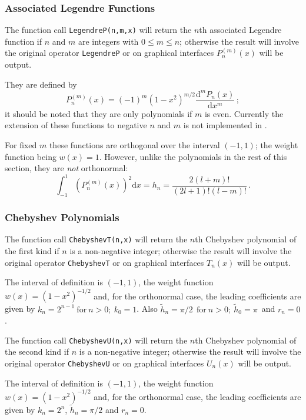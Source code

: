 \subsubsection{Associated Legendre Functions}
The function call \texttt{LegendreP(n,m,x)} will return the $n$th associated
Legendre function if $n$ and $m$ are integers with $0 \leq m \leq n$;
otherwise the result will involve the original operator \texttt{LegendreP} or
on graphical interfaces $P_n^{(m)}(x)$ will be output.

They are defined by
\[P_n^{(m)}(x) = (-1)^m(1-x^2)^{m/2}\frac{\mathrm{d}^m P_n(x)}{\mathrm{d}x^m}\,;\]
it should be noted that they are only polynomials if $m$ is even. Currently
the extension of these functions to negative $n$ and $m$ is not implemented
in \REDUCE.

For fixed $m$ these functions are orthogonal over the interval $(-1, 1)$;
the weight function being $w(x)=1$. However, unlike the polynomials in the rest
of this section, they are \emph{not} orthonormal:
\[\int_{-1}^1 \left(P_n^{(m)}(x)\right)^2 \mathrm{d}x = h_n =
\frac{2(l+m)!}{(2l+1)!(l-m)!}\,.\]

\subsubsection{Chebyshev Polynomials}
\hypertarget{CHEBYSHEVP}{}
 
The function call \texttt{ChebyshevT(n,x)} will return the $n$th Chebyshev
polynomial of the first kind if $n$ is a non-negative integer; otherwise the
result will involve the original operator \texttt{ChebyshevT} or on graphical
interfaces $T_n(x)$ will be output.

The interval of definition is $(-1, 1)$, the weight function
$w(x)=(1-x^2)^{-1/2}$ and, for the orthonormal case, the leading
coefficients are given by $k_n= 2^{n-1}\ \mbox{for}\ n>0;\ k_0 =1$. Also
$\tilde{h}_n = \pi/2\ \ \mbox{for}\ n>0;\ \tilde{h}_0 =\pi\,$ and $r_n=0$.

The function call \texttt{ChebyshevU(n,x)} will return the $n$th Chebyshev
polynomial of the second kind if $n$ is a non-negative integer; otherwise the
result will involve the original operator \texttt{ChebyshevU} or on graphical
interfaces $U_n(x)$ will be output.

The interval of definition is $(-1, 1)$, the weight function
$w(x)=(1-x^2)^{-1/2}$ and, for the orthonormal case, the leading
coefficients are given by $k_n= 2^n$, $\tilde{h}_n = \pi/2$ and $r_n=0$.


